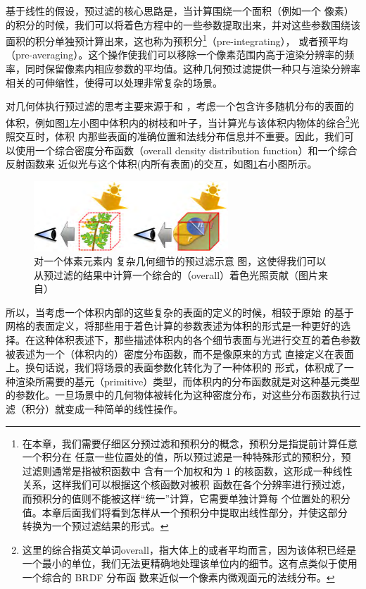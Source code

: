 基于线性的假设，预过滤的核心思路是，当计算围绕一个面积（例如一个 像素）的积分的时候，我们可以将着色方程中的一些参数提取出来，并对这些参数围绕该面积的积分单独预计算出来，这也称为预积分\footnote{在本章，我们需要仔细区分预过滤和预积分的概念，预积分是指提前计算任意一个积分在 任意一些位置处的值，所以预过滤是一种特殊形式的预积分，预过滤则通常是指被积函数中 含有一个加权和为 1 的核函数，这形成一种线性关系，这样我们可以根据这个核函数对被积 函数在各个分辨率进行预过滤，而预积分的值则不能被这样“统一”计算，它需要单独计算每 个位置处的积分值。本章后面我们将看到怎样从一个预积分中提取出线性部分，并使这部分 转换为一个预过滤结果的形式。}（pre-integrating）， 或者预平均（pre-averaging）。这个操作使我们可以移除一个像素范围内高于渲染分辨率的频率，同时保留像素内相应参数的平均值。这种几何预过滤提供一种只与渲染分辨率相关的可伸缩性，使得可以处理非常复杂的场景。

对几何体执行预过滤的思考主要来源于\cite{a:hypetrtexture}和\cite{a:Renderingfurwiththreedimensionaltextures} ，考虑一个包含许多随机分布的表面的体积，例如图\ref{f:vct-4-1}左小图中体积内的树枝和叶子，当计算光与该体积内物体的综合\footnote{这里的综合指英文单词overall，指大体上的或者平均而言，因为该体积已经是一个最小的单位，我们无法更精确地处理该单位内的细节。这有点类似于使用一个综合的 BRDF 分布函 数来近似一个像素内微观面元的法线分布。}光照交互时，体积 内那些表面的准确位置和法线分布信息并不重要。因此，我们可以使用一个综合密度分布函数（overall density distribution function）和一个综合反射函数来 近似光与这个体积(内所有表面)的交互，如图\ref{f:vct-4-1}右小图所示。

\begin{figure}
\sidecaption
	\includegraphics[width=0.65\textwidth]{figures/vct/vct-4-1}
	\caption{对一个体素元素内 复杂几何细节的预过滤示意 图，这使得我们可以从预过滤的结果中计算一个综合的（overall）着色光照贡献（图片来自\cite{a:InteractiveIndirectIlluminationUsingVoxelConeTracing}）}
	\label{f:vct-4-1}
\end{figure}


所以，当考虑一个体积内部的这些复杂的表面的定义的时候，相较于原始 的基于网格的表面定义，将那些用于着色计算的参数表述为体积的形式是一种更好的选择。在这种体积表述下，那些描述体积内的各个细节表面与光进行交互的着色参数被表述为一个（体积内的）密度分布函数，而不是像原来的方式 直接定义在表面上。换句话说，我们将场景的表面参数化转化为了一种体积的 形式，体积成了一种渲染所需要的基元（primitive）类型，而体积内的分布函数就是对这种基元类型的参数化。一旦场景中的几何物体被转化为这种密度分布，对这些分布函数执行过滤（积分）就变成一种简单的线性操作。

